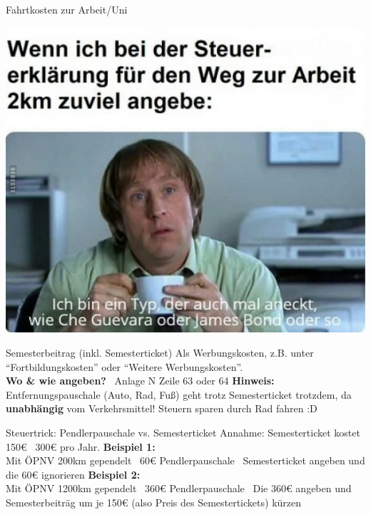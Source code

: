 \documentclass{beamer}
\begin{document}
			\begin{frame}{Fahrtkosten zur Arbeit/Uni}
				\begin{center}
					\includegraphics[height=0.85\textheight]{images/meme-fahrtkosten.jpg}
				\end{center}
			\end{frame}
		
			\begin{frame}{Semesterbeitrag (inkl. Semesterticket)}
				Als Werbungskosten, z.B. unter "`Fortbildungskosten"' oder "`Weitere Werbungskosten"'.\n
				\hfill\\\pause
				\textbf{Wo \& wie angeben?} \textrightarrow\ Anlage N Zeile 63 oder 64\n\pause
				\textbf{Hinweis:} Entfernungspauschale (Auto, Rad, Fuß) geht trotz Semesterticket trotzdem, da \textbf{unabhängig} vom Verkehrsmittel! Steuern sparen durch Rad fahren :D
			\end{frame}
		
			\begin{frame}{Steuertrick: Pendlerpauschale vs. Semesterticket}
				Annahme: Semesterticket kostet 150€ \textrightarrow\ 300€ pro Jahr.\n
				\textbf{Beispiel 1:}\\
				Mit ÖPNV 200km gependelt \textrightarrow\ 60€ Pendlerpauschale \textrightarrow\ Semesterticket angeben und die 60€ ignorieren\n
				\textbf{Beispiel 2:}\\
				Mit ÖPNV 1200km gependelt \textrightarrow\ 360€ Pendlerpauschale \textrightarrow\ Die 360€ angeben und Semesterbeiträg um je 150€ (also Preis des Semestertickets) kürzen
			\end{frame}
		
\end{document}
